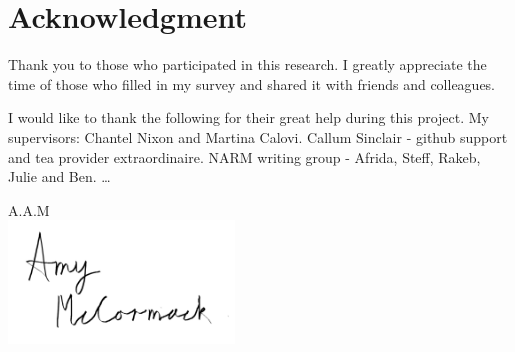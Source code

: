 
\section{Acknowledgment}
Thank you to those who participated in this research. I greatly appreciate the time of those who filled in my survey and shared it with friends and colleagues.

I would like to thank the following for their great help during this project. My supervisors: Chantel Nixon and Martina Calovi. Callum Sinclair - github support and tea provider extraordinaire. NARM writing group - Afrida, Steff, Rakeb, Julie and Ben.  \ldots



\begin{flushright}
A.A.M\\[1pc]
\includegraphics[width=6cm]{fig/to use signature png.png}
\end{flushright}
